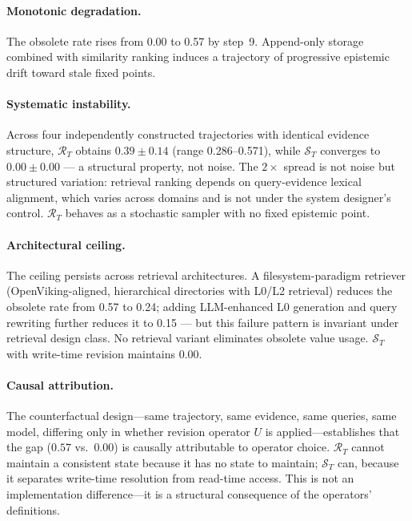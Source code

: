 \documentclass[letterpaper,twocolumn,10pt]{article}
\begin{document}
\paragraph{Monotonic degradation.} The obsolete rate rises from 0.00 to 0.57 by step~9. Append-only storage combined with similarity ranking induces a trajectory of progressive epistemic drift toward stale fixed points.

\paragraph{Systematic instability.} Across four independently constructed trajectories with identical evidence structure, $\mathcal{R}_T$ obtains $0.39\pm0.14$ (range 0.286--0.571), while $\mathcal{S}_T$ converges to $0.00\pm0.00$ --- a structural property, not noise. The $2\times$ spread is not noise but structured variation: retrieval ranking depends on query-evidence lexical alignment, which varies across domains and is not under the system designer's control. $\mathcal{R}_T$ behaves as a stochastic sampler with no fixed epistemic point.

\paragraph{Architectural ceiling.} The ceiling persists across retrieval architectures. A filesystem-paradigm retriever (OpenViking-aligned, hierarchical directories with L0/L2 retrieval) reduces the obsolete rate from 0.57 to 0.24; adding LLM-enhanced L0 generation and query rewriting further reduces it to 0.15 --- but this failure pattern is invariant under retrieval design class. No retrieval variant eliminates obsolete value usage. $\mathcal{S}_T$ with write-time revision maintains 0.00.

\paragraph{Causal attribution.} The counterfactual design---same trajectory, same evidence, same queries, same model, differing only in whether revision operator $U$ is applied---establishes that the gap ($0.57$ vs.\ $0.00$) is causally attributable to operator choice. $\mathcal{R}_T$ cannot maintain a consistent state because it has no state to maintain; $\mathcal{S}_T$ can, because it separates write-time resolution from read-time access. This is not an implementation difference---it is a structural consequence of the operators' definitions.
\end{document}
